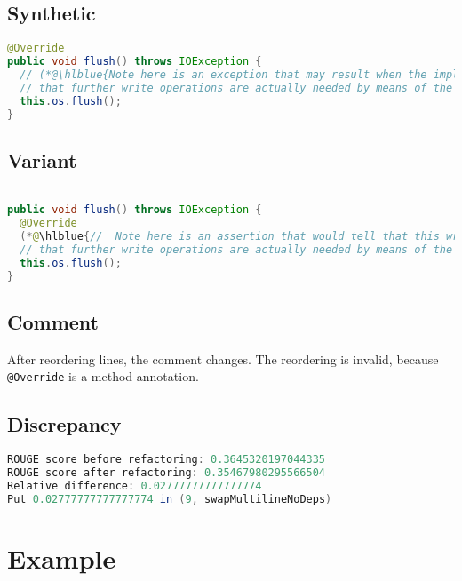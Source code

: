 \documentclass[11pt]{article}
\DeclareRobustCommand{\hlblue}[1]{{\sethlcolor{SeaGreen}\hl{#1}}}
\DeclareRobustCommand{\hlblue}[1]{{\sethlcolor{SkyBlue}\hl{#1}}}
\begin{document}
\subsection{Synthetic}

\begin{lstlisting}[language=java]
@Override
public void flush() throws IOException {
  // (*@\hlblue{Note here is an exception that may result when the implementation checks whether and if the operation succeeds to}@*)
  // that further write operations are actually needed by means of the isOverflown() method.
  this.os.flush();
}
\end{lstlisting}

\subsection{Variant}

\begin{lstlisting}[language=java]

public void flush() throws IOException {
  @Override
  (*@\hlblue{//  Note here is an assertion that would tell that this writer knows now as is in case we detect}@*)
  // that further write operations are actually needed by means of the isOverflown() method.
  this.os.flush();
}
\end{lstlisting}
\subsection{Comment}

After reordering lines, the comment changes. The reordering is invalid, because \texttt{@Override} is a method annotation.

\subsection{Discrepancy}

\begin{lstlisting}[language=java]
ROUGE score before refactoring: 0.3645320197044335
ROUGE score after refactoring: 0.35467980295566504
Relative difference: 0.02777777777777774
Put 0.02777777777777774 in (9, swapMultilineNoDeps)
\end{lstlisting}





\pagebreak
\section{Example}
\end{document}
